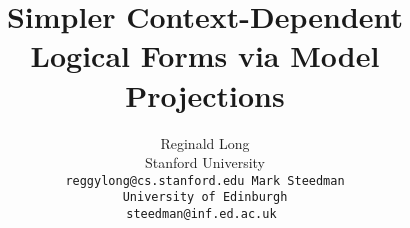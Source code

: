\documentclass[11pt]{article}
\title{Simpler Context-Dependent Logical Forms via Model Projections}
\author{
  Reginald Long \\
  Stanford University \\
  \tt{reggylong@cs.stanford.edu}
\And
  Mark Steedman \\
  University of Edinburgh \\
  \tt{steedman@inf.ed.ac.uk}
}
\date{}
\begin{document}
\maketitle

\begin{abstract}
  
\end{abstract}



 







\end{document}
